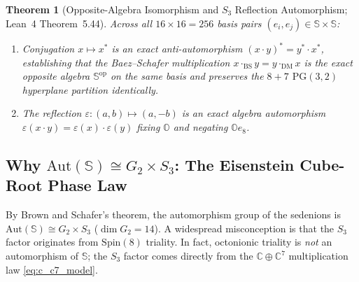 \documentclass[journal,twoside]{IEEEtran}
\newtheorem{theorem}{Theorem}
\theoremstyle{definition}
\theoremstyle{remark}
\newcommand{\C}{\mathbb{C}}
\newcommand{\Oc}{\mathbb{O}}
\newcommand{\Se}{\mathbb{S}}
\newcommand{\PG}{\mathrm{PG}}
\newcommand{\Aut}{\mathrm{Aut}}
\begin{document}
\begin{theorem}[Opposite-Algebra Isomorphism and $S_3$ Reflection Automorphism; Lean~4 Theorem~5.44]
\label{thm:opposite_and_s3}
Across all $16 \times 16 = 256$ basis pairs $(e_i, e_j) \in \Se \times \Se$:
\begin{enumerate}
    \item Conjugation $x \mapsto x^*$ is an exact anti-automorphism $(x \cdot y)^* = y^* \cdot x^*$, establishing that the Baez--Schafer multiplication $x \cdot_{\mathrm{BS}} y = y \cdot_{\mathrm{DM}} x$ is the exact opposite algebra $\Se^{\mathrm{op}}$ on the same basis and preserves the $8 + 7$ $\PG(3,2)$ hyperplane partition identically.
    \item The reflection $\varepsilon: (a, b) \mapsto (a, -b)$ is an exact algebra automorphism $\varepsilon(x\cdot y) = \varepsilon(x)\cdot \varepsilon(y)$ fixing $\Oc$ and negating $\Oc e_8$.
\end{enumerate}
\end{theorem}

\subsection{Why $\Aut(\Se) \cong G_2 \times S_3$: The Eisenstein Cube-Root Phase Law}
By Brown and Schafer's theorem, the automorphism group of the sedenions is $\Aut(\Se) \cong G_2 \times S_3$ ($\dim G_2 = 14$). A widespread misconception is that the $S_3$ factor originates from $\mathrm{Spin}(8)$ triality. In fact, octonionic triality is \emph{not} an automorphism of $\Se$; the $S_3$ factor comes directly from the $\C \oplus \C^7$ multiplication law \eqref{eq:c_c7_model}.
\end{document}
